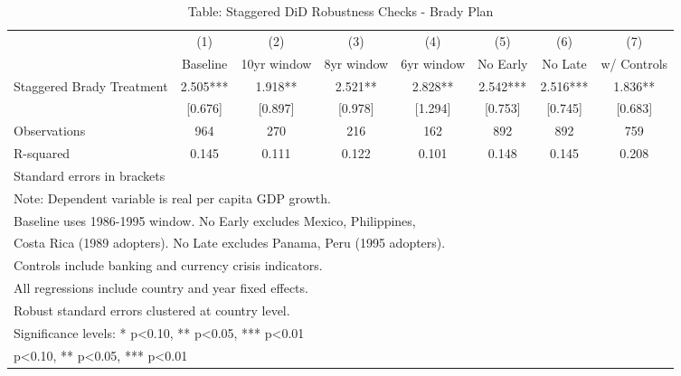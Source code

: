 \begin{table}[htbp]\centering
\def\sym#1{\ifmmode^{#1}\else\(^{#1}\)\fi}
\caption{Table: Staggered DiD Robustness Checks - Brady Plan}
\begin{tabular}{l*{7}{c}}
\toprule
                &\multicolumn{1}{c}{(1)}&\multicolumn{1}{c}{(2)}&\multicolumn{1}{c}{(3)}&\multicolumn{1}{c}{(4)}&\multicolumn{1}{c}{(5)}&\multicolumn{1}{c}{(6)}&\multicolumn{1}{c}{(7)}\\
                &\multicolumn{1}{c}{Baseline}&\multicolumn{1}{c}{10yr window}&\multicolumn{1}{c}{8yr window}&\multicolumn{1}{c}{6yr window}&\multicolumn{1}{c}{No Early}&\multicolumn{1}{c}{No Late}&\multicolumn{1}{c}{w/ Controls}\\
\midrule
Staggered Brady Treatment&    2.505***&    1.918** &    2.521** &    2.828** &    2.542***&    2.516***&    1.836** \\
                &  [0.676]   &  [0.897]   &  [0.978]   &  [1.294]   &  [0.753]   &  [0.745]   &  [0.683]   \\
\midrule
Observations    &      964   &      270   &      216   &      162   &      892   &      892   &      759   \\
R-squared       &    0.145   &    0.111   &    0.122   &    0.101   &    0.148   &    0.145   &    0.208   \\
\bottomrule
\multicolumn{8}{l}{\footnotesize Standard errors in brackets}\\
\multicolumn{8}{l}{\footnotesize Note: Dependent variable is real per capita GDP growth.}\\
\multicolumn{8}{l}{\footnotesize Baseline uses 1986-1995 window. No Early excludes Mexico, Philippines,}\\
\multicolumn{8}{l}{\footnotesize Costa Rica (1989 adopters). No Late excludes Panama, Peru (1995 adopters).}\\
\multicolumn{8}{l}{\footnotesize Controls include banking and currency crisis indicators.}\\
\multicolumn{8}{l}{\footnotesize All regressions include country and year fixed effects.}\\
\multicolumn{8}{l}{\footnotesize Robust standard errors clustered at country level.}\\
\multicolumn{8}{l}{\footnotesize Significance levels: * p<0.10, ** p<0.05, *** p<0.01}\\
\multicolumn{8}{l}{\footnotesize * p<0.10, ** p<0.05, *** p<0.01}\\
\end{tabular}
\end{table}
